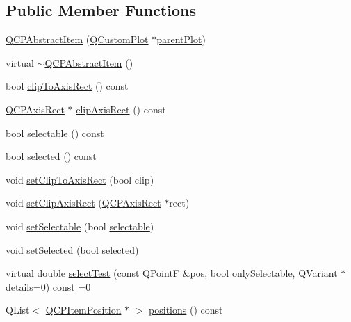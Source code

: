 \subsection*{Public Member Functions}
\begin{DoxyCompactItemize}
\item 
\hyperlink{class_q_c_p_abstract_item_a9922507d8b4503a1fe1ed0b1030e23b6}{Q\-C\-P\-Abstract\-Item} (\hyperlink{class_q_custom_plot}{Q\-Custom\-Plot} $\ast$\hyperlink{class_q_c_p_layerable_ab7e0e94461566093d36ffc0f5312b109}{parent\-Plot})
\item 
virtual \hyperlink{class_q_c_p_abstract_item_a375bd1b7d3218b04a6ff7ff06fff917c}{$\sim$\-Q\-C\-P\-Abstract\-Item} ()
\item 
bool \hyperlink{class_q_c_p_abstract_item_a5b0ea171823033bcb8aee81f4a034871}{clip\-To\-Axis\-Rect} () const 
\item 
\hyperlink{class_q_c_p_axis_rect}{Q\-C\-P\-Axis\-Rect} $\ast$ \hyperlink{class_q_c_p_abstract_item_aeaecafc8043eb74986e169c7c6899bcf}{clip\-Axis\-Rect} () const 
\item 
bool \hyperlink{class_q_c_p_abstract_item_a9189e752025533e1595eaade0009a3bc}{selectable} () const 
\item 
bool \hyperlink{class_q_c_p_abstract_item_a225865808640d8d9a7dd19f09a2e93f2}{selected} () const 
\item 
void \hyperlink{class_q_c_p_abstract_item_a39e05b9d4176b9accafc746d16ca6a06}{set\-Clip\-To\-Axis\-Rect} (bool clip)
\item 
void \hyperlink{class_q_c_p_abstract_item_a7dc75fcbcd10206fe0b75d757ea7a347}{set\-Clip\-Axis\-Rect} (\hyperlink{class_q_c_p_axis_rect}{Q\-C\-P\-Axis\-Rect} $\ast$rect)
\item 
void \hyperlink{class_q_c_p_abstract_item_a8a8e32a55bc478b849756a78c2d87fd2}{set\-Selectable} (bool \hyperlink{class_q_c_p_abstract_item_a9189e752025533e1595eaade0009a3bc}{selectable})
\item 
void \hyperlink{class_q_c_p_abstract_item_a203de94ad586cc44d16c9565f49d3378}{set\-Selected} (bool \hyperlink{class_q_c_p_abstract_item_a225865808640d8d9a7dd19f09a2e93f2}{selected})
\item 
virtual double \hyperlink{class_q_c_p_abstract_item_a96d522d10ffc0413b9a366c6f7f0476b}{select\-Test} (const Q\-Point\-F \&pos, bool only\-Selectable, Q\-Variant $\ast$details=0) const =0
\item 
Q\-List$<$ \hyperlink{class_q_c_p_item_position}{Q\-C\-P\-Item\-Position} $\ast$ $>$ \hyperlink{class_q_c_p_abstract_item_adf6a680cc29a6bce8345c3b6af3a91a1}{positions} () const 

\end{DoxyCompactItemize}
